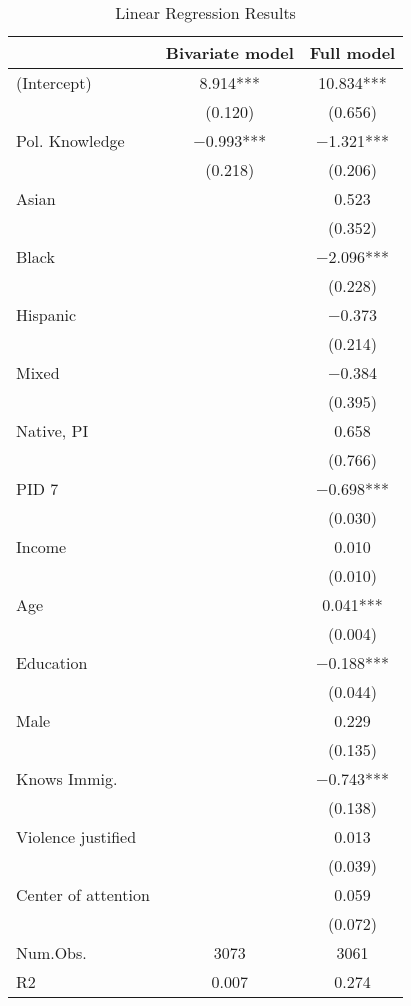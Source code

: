 \begin{table}[htbp]
\centering
\caption{Linear Regression Results \label{tab:ols_rr}}
\centering
\begin{tabular}[t]{lcc}
\toprule
  & Bivariate model & Full model\\
\midrule
(Intercept) & \num{8.914}*** & \num{10.834}***\\
 & (\num{0.120}) & (\num{0.656})\\
Pol. Knowledge & \num{-0.993}*** & \num{-1.321}***\\
 & (\num{0.218}) & (\num{0.206})\\
Asian &  & \num{0.523}\\
 &  & (\num{0.352})\\
Black &  & \num{-2.096}***\\
 &  & (\num{0.228})\\
Hispanic &  & \num{-0.373}\\
 &  & (\num{0.214})\\
Mixed &  & \num{-0.384}\\
 &  & (\num{0.395})\\
Native, PI &  & \num{0.658}\\
 &  & (\num{0.766})\\
PID 7 &  & \num{-0.698}***\\
 &  & (\num{0.030})\\
Income &  & \num{0.010}\\
 &  & (\num{0.010})\\
Age &  & \num{0.041}***\\
 &  & (\num{0.004})\\
Education &  & \num{-0.188}***\\
 &  & (\num{0.044})\\
Male &  & \num{0.229}\\
 &  & (\num{0.135})\\
Knows Immig. &  & \num{-0.743}***\\
 &  & (\num{0.138})\\
Violence justified &  & \num{0.013}\\
 &  & (\num{0.039})\\
Center of attention &  & \num{0.059}\\
 &  & (\num{0.072})\\
\midrule
Num.Obs. & \num{3073} & \num{3061}\\
R2 & \num{0.007} & \num{0.274}\\
\bottomrule
\end{tabular}
\end{table}
